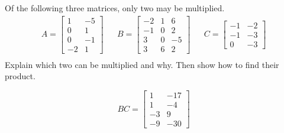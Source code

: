
\begin{exerciseStatement}


Of the following three matrices, only two may be multiplied. 
\begin{align*} A= \left[\begin{array}{cc}
1 & -5 \\
0 & 1 \\
0 & -1 \\
-2 & 1
\end{array}\right]  & & B= \left[\begin{array}{ccc}
-2 & 1 & 6 \\
-1 & 0 & 2 \\
3 & 0 & -5 \\
3 & 6 & 2
\end{array}\right]  & & C= \left[\begin{array}{cc}
-1 & -2 \\
-1 & -3 \\
0 & -3
\end{array}\right]  \\ \end{align*}
             Explain which two can be multiplied and why. Then show how to find their product.


\end{exerciseStatement}
    
\begin{exerciseAnswer} 
\[BC= \left[\begin{array}{cc}
1 & -17 \\
1 & -4 \\
-3 & 9 \\
-9 & -30
\end{array}\right] \]
\end{exerciseAnswer}
    
